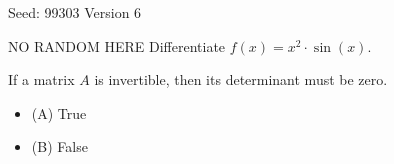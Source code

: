 \documentclass[12pt]{exam}
\begin{document}
{\small Seed: 99303 \hfill Version 6}

\vspace{1em}

\begin{questions}


\question NO RANDOM HERE Differentiate $f(x) = x^2 \cdot \sin(x)$.




  \vspace{2\baselineskip}  %






\vspace{1em}

\question If a matrix $A$ is invertible, then its determinant must be zero.




  \begin{itemize}[label={}]
    \item (A) True
    \item (B) False
  \end{itemize}







\vspace{1em}


\end{questions}
\end{document}
